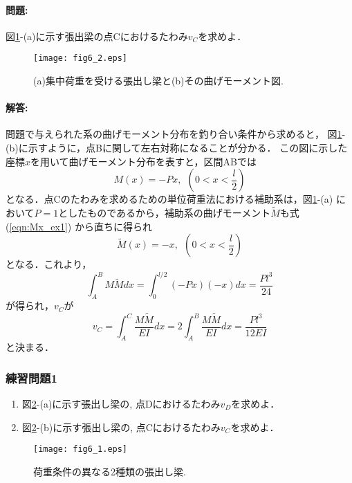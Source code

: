 ﻿\documentclass[10pt,a4j]{jarticle}
\begin{document}
\paragraph{問題:}
図\ref{fig:fig6_2}-(a)に示す張出梁の点Cにおけるたわみ$v_C$を求めよ．
\begin{figure}[h]
	\begin{center}
	\texttt{[image: fig6\_2.eps]} 
	\end{center}
	\caption{(a)集中荷重を受ける張出し梁と(b)その曲げモーメント図.} 
	\label{fig:fig6_2}
\end{figure}
\paragraph{解答:}
問題で与えられた系の曲げモーメント分布を釣り合い条件から求めると，
図\ref{fig:fig6_2}-(b)に示すように，点Bに関して左右対称になることが分かる．
この図に示した座標$x$を用いて曲げモーメント分布を表すと，区間ABでは
\begin{equation}
	M(x)=-Px,  \ \ \left(0< x < \frac{l}{2} \right) 
	\label{eqn:Mx_ex1}
\end{equation}
となる．点Cのたわみを求めるための単位荷重法における補助系は，図\ref{fig:fig6_2}-(a)
において$P=1$としたものであるから，補助系の曲げモーメント$\tilde M$も式(\ref{eqn:Mx_ex1})
から直ちに得られ
\begin{equation}
	\tilde M(x)=-x,  \ \ \left(0< x < \frac{l}{2} \right) 
	\label{eqn:Mxt_ex1}
\end{equation}
となる．これより，
\begin{equation}
	\int _A^B M\tilde M dx = 
	\int_0^{l/2} (-Px)(-x) dx = \frac{Pl^3}{24}
	\label{eqn:}
\end{equation}
が得られ，$v_C$が
\begin{equation}
	v_C=\int_A^C \frac{M \tilde M}{EI}dx
	=2\int_A^B \frac{M \tilde M}{EI}dx=
	\frac{Pl^3}{12EI}
	\label{eqn:}
\end{equation}
と決まる．
\subsubsection{練習問題1}
\begin{enumerate}
\item
	図\ref{fig:fig6_1}-(a)に示す張出し梁の, 点Dにおけるたわみ$v_D$を求めよ．
\item
	図\ref{fig:fig6_1}-(b)に示す張出し梁の, 点Cにおけるたわみ$v_C$を求めよ．
\end{enumerate}
\begin{figure}[h]
	\begin{center}
	\texttt{[image: fig6\_1.eps]} 
	\end{center}
	\caption{荷重条件の異なる2種類の張出し梁.} 
	\label{fig:fig6_1}
\end{figure}
\end{document}
